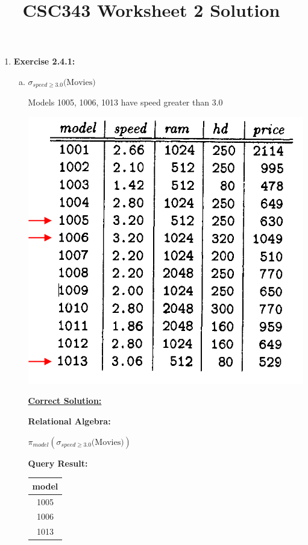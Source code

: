 \documentclass[12pt]{article}
\begin{document}
\title{CSC343 Worksheet 2 Solution}
\maketitle

\bigskip

\begin{enumerate}
    \item \textbf{Exercise 2.4.1:}

    \begin{enumerate}[a)]
        \item

        $\sigma_{speed \geq 3.0}\text{(Movies)}$

        \bigskip

        Models 1005, 1006, 1013 have speed greater than 3.0

        \bigskip

        \begin{center}
        \includegraphics[width=0.4\linewidth]{images/worksheet_2_solution_2.png}
        \end{center}

        \bigskip

        \begin{mdframed}
            \underline{\textbf{Correct Solution:}}

            \bigskip

            \color{red}

            \textbf{Relational Algebra:}

            \bigskip

            $\pi_{model}(\sigma_{speed \geq 3.0}\text{(Movies)})$

            \bigskip

            \textbf{Query Result:}

            \bigskip

            \begin{tabular}{|c|}
                \hline
                model\\
                \hline
                1005\\
                \hline
                1006\\
                \hline
                1013\\
                \hline
            \end{tabular}
            \color{black}


\end{mdframed}
\end{enumerate}
\end{enumerate}
\end{document}
